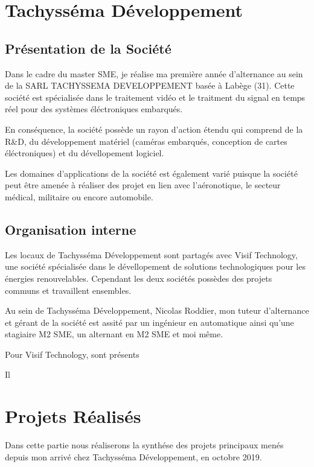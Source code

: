 \section{Tachysséma Développement}
\subsection{Présentation de la Société}

Dans le cadre du master SME, je réalise ma première année d'alternance au sein de la SARL TACHYSSEMA DEVELOPPEMENT basée à Labège (31).
Cette société est spécialisée dans le traitement vidéo et le traitment du signal en temps réel pour des systèmes éléctroniques embarqués. 

En conséquence, la société possède un rayon d'action étendu qui comprend de la R\&D, du développement matériel (caméras embarqués, conception de cartes éléctroniques) et du dévellopement logiciel. 

Les domaines d'applications de la société est également varié puisque la société peut être amenée à réaliser des projet en lien avec l'aéronotique, le secteur médical, militaire ou encore automobile. 



\subsection{Organisation interne}

Les locaux de Tachysséma Développement sont partagés avec Visif Technology, une société spécialisée dans le dévellopement de solutions technologiques pour les énergies renouvelables. Cependant les deux sociétés possèdes des projets communs et travaillent ensembles. 

Au sein de Tachysséma Développement, Nicolas Roddier, mon tuteur d'alternance et gérant de la société est assité par un ingénieur en automatique ainsi qu'une stagiaire M2 SME, un alternant en M2 SME et moi même. 

Pour Visif Technology, sont présents 

Il 



\newpage

\section{Projets Réalisés}
Dans cette partie nous réaliserons la synthése des projets principaux menés depuis mon arrivé chez Tachysséma Développement, en octobre 2019. 

